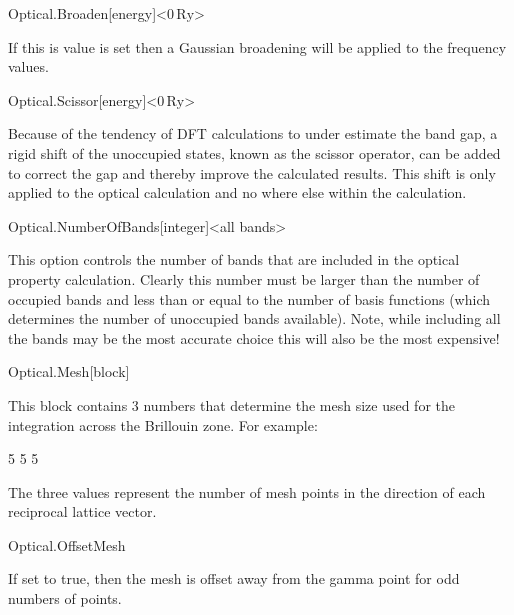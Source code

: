 \begin{fdfentry}{Optical.Broaden}[energy]<$0\,\mathrm{Ry}$>

  If this is value is set then a Gaussian broadening will be applied
  to the frequency values.

\end{fdfentry}

\begin{fdfentry}{Optical.Scissor}[energy]<$0\,\mathrm{Ry}$>

  Because of the tendency of DFT calculations to under estimate the
  band gap, a rigid shift of the unoccupied states, known as the
  scissor operator, can be added to correct the gap and thereby
  improve the calculated results. This shift is only applied to the
  optical calculation and no where else within the calculation.

\end{fdfentry}

\begin{fdfentry}{Optical.NumberOfBands}[integer]<all bands>
  
  This option controls the number of bands that are included in the
  optical property calculation. Clearly this number must be larger
  than the number of occupied bands and less than or equal to the
  number of basis functions (which determines the number of unoccupied
  bands available). Note, while including all the bands may be the
  most accurate choice this will also be the most expensive!

\end{fdfentry}

\begin{fdfentry}{Optical.Mesh}[block]

  This block contains 3 numbers that determine the mesh size used for
  the integration across the Brillouin zone. For example:
  \begin{fdfexample}
        5 5 5
  \end{fdfexample}
  The three values represent the number of mesh points in the
  direction of each reciprocal lattice vector.

\end{fdfentry}


\begin{fdflogicalF}{Optical.OffsetMesh}
  
  If set to true, then the mesh is offset away from the gamma point
  for odd numbers of points.

\end{fdflogicalF}

